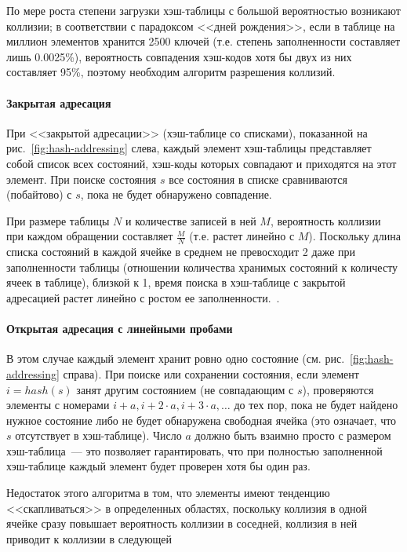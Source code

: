 По мере роста степени загрузки хэш-таблицы с большой вероятностью возникают коллизии; в
соответствии с парадоксом <<дней рождения>>, если в таблице на миллион элементов хранится
2500 ключей (т.е. степень заполненности составляет лишь 0.0025\%), вероятность совпадения
хэш-кодов хотя бы двух из них составляет 95\%, поэтому необходим алгоритм разрешения
коллизий.

\paragraph{Закрытая адресация}
\label{sec:closed-addressing}

При <<закрытой адресации>> (хэш-таблице со списками), показанной на
рис.~\ref{fig:hash-addressing} слева, каждый элемент хэш-таблицы представляет собой список
всех состояний, хэш-коды которых совпадают и приходятся на этот элемент. При поиске
состояния $s$ все состояния в списке сравниваются (побайтово) с $s$, пока не будет
обнаружено совпадение.

При размере таблицы $N$ и количестве записей в ней $M$, вероятность коллизии при каждом
обращении составляет $\frac{M}{N}$ (т.е. растет линейно с $M$). Поскольку длина списка
состояний в каждой ячейке в среднем не превосходит 2 даже при заполненности таблицы
(отношении количества хранимых состояний к количесту ячеек в таблице), близкой к 1, время
поиска в хэш-таблице с закрытой адресацией растет линейно с ростом ее
заполненности.~\cite{CDataStructures}.

\paragraph{Открытая адресация с линейными пробами}
\label{sec:open-linear-probing}

В этом случае каждый элемент хранит ровно одно состояние
(см. рис.~\ref{fig:hash-addressing} справа). При поиске или сохранении состояния, если
элемент $i = hash(s)$ занят другим состоянием (не совпадающим с $s$), проверяются элементы
с номерами $i + a, i + 2 \cdot a, i + 3 \cdot a, \ldots$ до тех пор, пока не будет найдено
нужное состояние либо не будет обнаружена свободная ячейка (это означает, что $s$
отсутствует в хэш-таблице). Число $a$ должно быть взаимно просто с размером
хэш-таблица~--- это позволяет гарантировать, что при полностью заполненной хэш-таблице
каждый элемент будет проверен хотя бы один раз.

Недостаток этого алгоритма в том, что элементы имеют тенденцию <<скапливаться>> в
определенных областях, поскольку коллизия в одной ячейке сразу повышает вероятность
коллизии в соседней, коллизия в ней приводит к коллизии в следующей\etc

